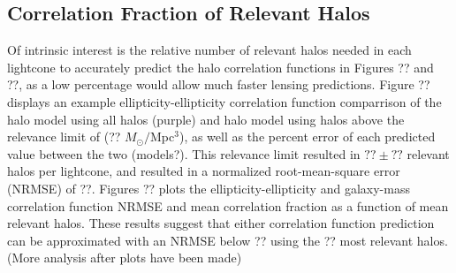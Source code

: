 \documentclass[%
 reprint,
 amsmath,amssymb,
 aps,nofootinbib
]{revtex4-1}
\begin{document}
\subsection{Correlation Fraction of Relevant Halos}

Of intrinsic interest is the relative number of relevant halos needed in each lightcone to accurately predict the halo correlation functions in Figures ?? and ??, as a low percentage would allow much faster lensing predictions. Figure ?? displays an example ellipticity-ellipticity correlation function comparrison of the halo model using all halos (purple) and halo model using halos above the relevance limit of (?? $M_{\odot}/$Mpc$^3$), as well as the percent error of each predicted value between the two (models?). This relevance limit resulted in $??\pm??$ relevant halos per lightcone, and resulted in a normalized root-mean-square error (NRMSE) of ??. Figures ?? plots the ellipticity-ellipticity and galaxy-mass correlation function NRMSE and mean correlation fraction as a function of mean relevant halos. These results suggest that either correlation function prediction can be approximated with an NRMSE below ?? using the ?? most relevant halos. (More analysis after plots have been made)

%

%
\end{document}

